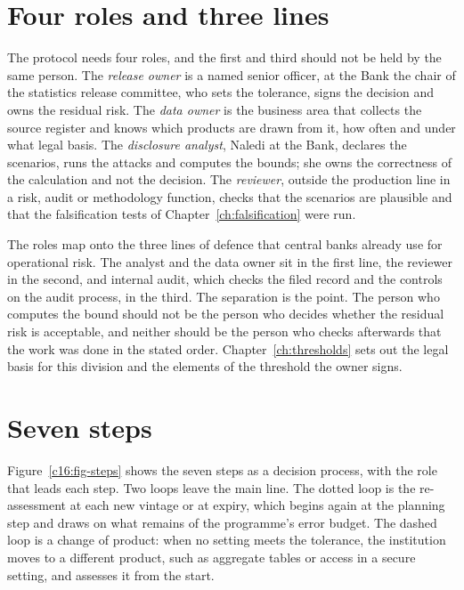 \section{Four roles and three lines}

The protocol needs four roles, and the first and third should not be held by the
same person. The \emph{release owner} is a named senior officer, at the Bank the
chair of the statistics release committee, who sets the tolerance, signs the
decision and owns the residual risk. The \emph{data owner} is the business area that
collects the source register and knows which products are drawn from it, how often
and under what legal basis. The \emph{disclosure analyst}, Naledi at the Bank,
declares the scenarios, runs the attacks and computes the bounds; she owns the
correctness of the calculation and not the decision. The \emph{reviewer}, outside
the production line in a risk, audit or methodology function, checks that the
scenarios are plausible and that the falsification tests of
Chapter~\ref{ch:falsification} were run.

The roles map onto the three lines of defence that central banks already use for
operational risk. The analyst and the data owner sit in the first line, the
reviewer in the second, and internal audit, which checks the filed record and the
controls on the audit process, in the third. The separation is the point. The
person who computes the bound should not be the person who decides whether the
residual risk is acceptable, and neither should be the person who checks afterwards
that the work was done in the stated order. Chapter~\ref{ch:thresholds} sets out the
legal basis for this division and the elements of the threshold the owner signs.

\section{Seven steps}

Figure~\ref{c16:fig-steps} shows the seven steps as a decision process, with the
role that leads each step. Two loops leave the main line. The dotted loop is the
re-assessment at each new vintage or at expiry, which begins again at the planning
step and draws on what remains of the programme's error budget. The dashed loop is a
change of product: when no setting meets the tolerance, the institution moves to a
different product, such as aggregate tables or access in a secure setting, and
assesses it from the start.

